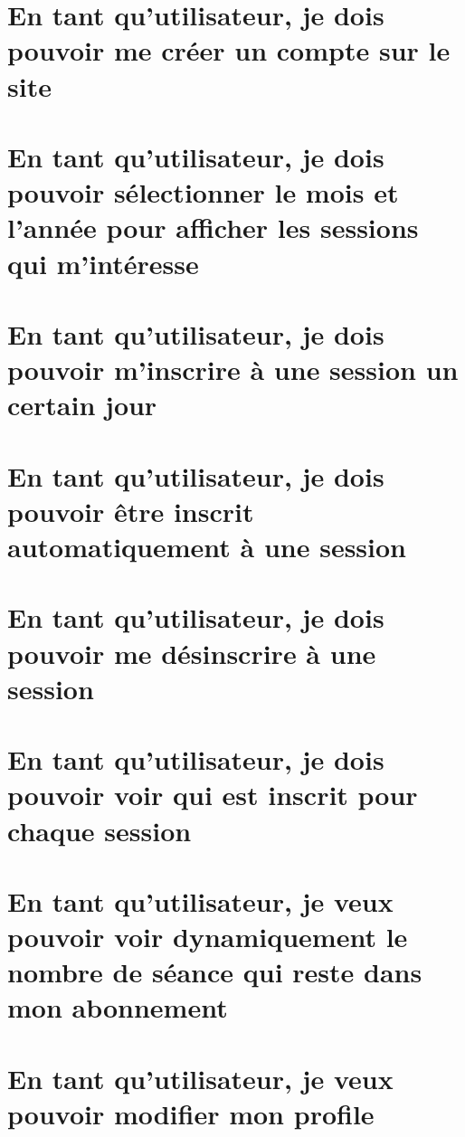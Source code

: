 \section{En tant qu’utilisateur, je dois pouvoir me créer un compte sur le site}
	

\vspace{\baselineskip}
\section{En tant qu'utilisateur, je dois pouvoir sélectionner le mois et l'année pour afficher les sessions qui m'intéresse}
	

\newpage
\section{En tant qu’utilisateur, je dois pouvoir m’inscrire à une session un certain jour}
	

\newpage
\section{En tant qu’utilisateur, je dois pouvoir être inscrit automatiquement à une session}
	
	
\newpage
\section{En tant qu’utilisateur, je dois pouvoir me désinscrire à une session}
	

\newpage
\section{En tant qu’utilisateur, je dois pouvoir voir qui est inscrit pour chaque session}
	
	
\section{En tant qu’utilisateur, je veux pouvoir voir dynamiquement le nombre de séance qui reste dans mon abonnement}
	

\newpage
\section{En tant qu'utilisateur, je veux pouvoir modifier mon profile}
	

